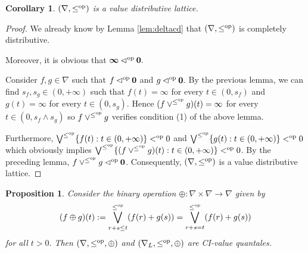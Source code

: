 \documentclass[11pt,a4paper]{amsart}
\newtheorem{proposition}[theorem]{Proposition}
\newtheorem{corollary}[theorem]{Corollary}
\theoremstyle{definition}
\begin{document}
	
	\begin{corollary}
		$(\nabla,\leq^\text{\normalfont op})$ is a value distributive lattice.
	\end{corollary}
	
	\begin{proof}
		We already know by Lemma \ref{lem:deltacd} that $(\nabla,\leq^\text{\normalfont op})$ is completely distributive. 
		
		Moreover, it is obvious that $\boldsymbol{\infty}\lhd^\text{\normalfont op}\mathbf{0}.$
		
		Consider $f,g\in\nabla$ such that $f\lhd^\text{\normalfont op}\mathbf{0}$ and $g\lhd^\text{\normalfont op}\mathbf{0}.$ By the previous lemma, we can find $s_f,s_g\in (0,+\infty)$ such that $f(t)=\infty$ for every $t\in (0,s_f)$ and $g(t)=\infty$ for every $t\in (0,s_g)$. Hence $(f\vee^{\leq^\text{\normalfont op}} g)(t)=\infty$ for every $t\in (0,s_f\wedge s_g)$ so $f\vee^{\leq^\text{\normalfont op}} g$ verifies condition (1) of the above lemma.
		
		Furthermore, $\bigvee^{\leq^\text{\normalfont op}} \{f(t):t\in (0,+\infty)\}<^\text{\normalfont op}0$ and $\bigvee^{\leq^\text{\normalfont op}} \{g(t):t\in (0,+\infty)\}<^\text{\normalfont op}0$ which obviously implies $\bigvee^{\leq^\text{\normalfont op}} \{(f\vee^{\leq^\text{\normalfont op}} g)(t):t\in (0,+\infty)\}<^\text{\normalfont op}0$. By the preceding lemma, $f\vee^{\leq^\text{\normalfont op}} g\lhd^\text{\normalfont op}\mathbf{0}$. Consequently, $(\nabla,\leq^\text{\normalfont op})$ is a value distributive lattice.
	\end{proof}
	
	\begin{proposition}\label{prop:civalueq}
		Consider the binary operation $\oplus:\nabla\times\nabla\to\nabla$ given by
		\[(f\oplus g)(t):=\bigvee_{r+s\leq t}^{\leq^\text{\normalfont op}}(f(r)+g(s))=\bigvee_{r+s=t}^{\leq^\text{\normalfont op}}(f(r)+g(s))\]
		for all $t>0.$ 
		Then $(\nabla,\leq^\text{\normalfont op},\oplus)$ and $(\nabla_L,\leq^\text{\normalfont op},\oplus)$ are  CI-value quantales.
	\end{proposition}
	
\end{document}
